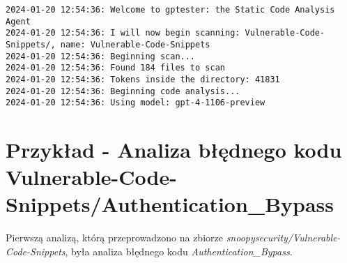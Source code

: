 \begin{verbatim}
2024-01-20 12:54:36: Welcome to gptester: the Static Code Analysis Agent
2024-01-20 12:54:36: I will now begin scanning: Vulnerable-Code-Snippets/, name: Vulnerable-Code-Snippets
2024-01-20 12:54:36: Beginning scan...
2024-01-20 12:54:36: Found 184 files to scan
2024-01-20 12:54:36: Tokens inside the directory: 41831
2024-01-20 12:54:36: Beginning code analysis...
2024-01-20 12:54:36: Using model: gpt-4-1106-preview
\end{verbatim}

\section{Przykład - Analiza błędnego kodu Vulnerable-Code-Snippets/Authentication\_Bypass}
\label{sec:analiza_blednego_kodu}
Pierwszą analizą, którą przeprowadzono na zbiorze \textit{snoopysecurity/Vulnerable-Code-Snippets}, była analiza błędnego kodu \textit{Authentication\_Bypass}. 

